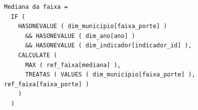 \begin{verbatim}
Mediana da faixa =
  IF (
    HASONEVALUE ( dim_municipio[faixa_porte] )
      && HASONEVALUE ( dim_ano[ano] )
      && HASONEVALUE ( dim_indicador[indicador_id] ),
    CALCULATE (
      MAX ( ref_faixa[mediana] ),
      TREATAS ( VALUES ( dim_municipio[faixa_porte] ), ref_faixa[faixa_porte] )
    )
  )
\end{verbatim}
